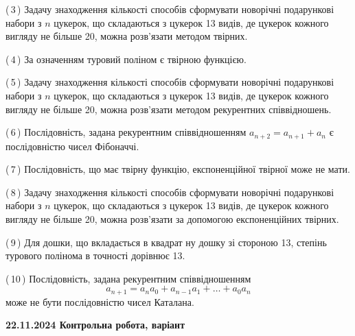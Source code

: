 \documentclass[12pt, ukrainian]{article}
\begin{document}
\begin {large}
\begin {large}
\begin {large}
\begin {large}
\begin {large}
\begin {large}
\begin {large}
\begin {large}
\begin {large}
\begin {large}
\begin {large}
\begin {large}
\begin {large}
\begin {large}
\begin {large}
\begin {large}
\begin {large}
\begin {large}
\begin {large}
\begin {large}
\begin {large}
\begin {large}
\begin {large}
\begin {large}
\begin {large}
\begin {large}
\begin {large}
\begin {large}
\begin {large}
\begin {large}
\begin {large}
\begin {large}
\begin {large}
\begin {large}
\begin {large}
\begin {large}
\begin {large}
\begin {large}
\begin {large}
\begin {large}
\begin {large}
{(\,3\,) Задачу знаходження кількості способів сформувати новорічні подарункові набори з $n$ цукерок, що складаються з цукерок 13 видів, де цукерок кожного вигляду не більше 20, можна розв’язати методом твірних.%



(\,4\,) За означенням туровий поліном є твірною функцією.%



(\,5\,) Задачу знаходження кількості способів сформувати новорічні подарункові набори з $n$ цукерок, що складаються з цукерок 13 видів, де цукерок кожного вигляду не більше 20, можна розв’язати методом рекурентних співвідношень.%



(\,6\,) Послідовність, задана рекурентним співвідношенням $a_{n+2}=a_{n+1}+a_{n}$ є послідовністю чисел Фібоначчі.%



(\,7\,) Послідовність, що має твірну функцію, експоненційної твірної може не мати.%



(\,8\,) Задачу знаходження кількості способів сформувати новорічні подарункові набори з $n$ цукерок, що складаються з цукерок 13 видів, де цукерок кожного вигляду не більше 20, можна розв’язати за допомогою експоненційних твірних.%



(\,9\,) Для дошки, що вкладається в квадрат ну дошку зі стороною 13, степінь турового полінома в точності дорівнює 13.%



(\,10\,) Послідовність, задана рекурентним співвідношенням $$a_{n+1}=a_{n}a_{0}+a_{n-1}a_{1}+\ldots+a_0a_{n}$$ може не бути послідовністю чисел Каталана.%




\vspace{5mm}
}
\newpage

\begin {large}

\textbf{22.11.2024 Контрольна робота, варіант  }\par



\end{large}
\end{large}
\end{large}
\end{large}
\end{large}
\end{large}
\end{large}
\end{large}
\end{large}
\end{large}
\end{large}
\end{large}
\end{large}
\end{large}
\end{large}
\end{large}
\end{large}
\end{large}
\end{large}
\end{large}
\end{large}
\end{large}
\end{large}
\end{large}
\end{large}
\end{large}
\end{large}
\end{large}
\end{large}
\end{large}
\end{large}
\end{large}
\end{large}
\end{large}
\end{large}
\end{large}
\end{large}
\end{large}
\end{large}
\end{large}
\end{large}
\end{large}
\end{document}
